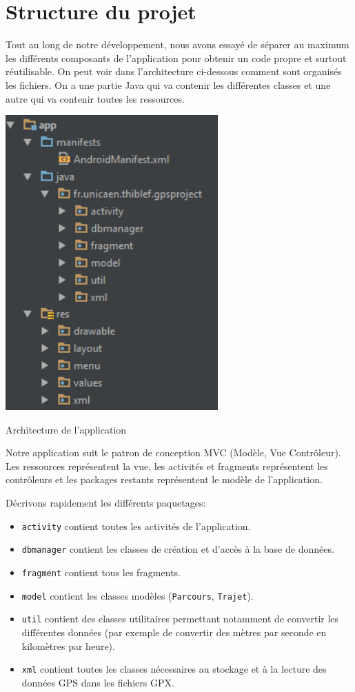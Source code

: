 \section{Structure du projet}

Tout au long de notre développement, nous avons essayé de séparer au maximum les différents composants de l'application pour obtenir un code propre et surtout réutilisable. On peut voir dans l'architecture ci-dessous comment sont organisés les fichiers. On a une partie Java qui va contenir les différentes classes et une autre qui va contenir toutes les ressources.\bigskip

\begin{img}
  \includegraphics[scale=0.6]{img/archi.png}
  \caption{Architecture de l'application}
\end{img}

Notre application suit le patron de conception MVC (Modèle, Vue Contrôleur). Les ressources représentent la vue, les activités et fragments représentent les contrôleurs et les packages restants représentent le modèle de l'application.\bigskip

Décrivons rapidement les différents paquetages:\bigskip

\begin{itemize}
 	\item \verb!activity! contient toutes les activités de l'application.
 	\item \verb!dbmanager! contient les classes de création et d'accès à la base de données.
 	\item \verb!fragment! contient tous les fragments.
 	\item \verb!model! contient les classes modèles (\verb!Parcours!, \verb!Trajet!).
 	\item \verb!util! contient des classes utilitaires permettant notamment de convertir les différentes données (par exemple de convertir des mètres par seconde en kilomètres par heure).
 	\item \verb!xml! contient toutes les classes nécessaires au stockage et à la lecture des données GPS dans les fichiers GPX.
\end{itemize}\bigskip
 



